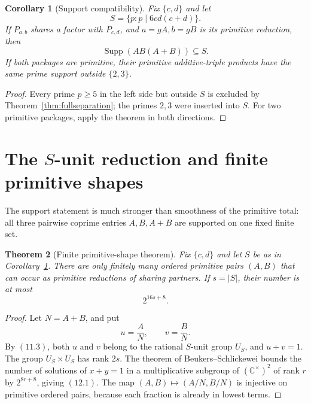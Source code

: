 \documentclass[11pt]{article}
\newtheorem{theorem}{Theorem}[section]
\newtheorem{corollary}[theorem]{Corollary}
\theoremstyle{definition}
\newcommand{\C}{\mathbb C}
\begin{document}
\begin{corollary}[Support compatibility]
\label{cor:supportcompatibility}
Fix \(\{c,d\}\) and let
\[
 S=\{p:p\mid6cd(c+d)\}.
\]
If \(P_{a,b}\) shares a factor with \(P_{c,d}\), and
\(a=gA,b=gB\) is its primitive reduction, then
\begin{equation}
 \operatorname{Supp}(AB(A+B))\subseteq S.
 \tag{11.3}
\end{equation}
If both packages are primitive, their primitive additive-triple products have
the same prime support outside \(\{2,3\}\).
\end{corollary}

\begin{proof}
Every prime \(p\geq5\) in the left side but outside \(S\) is excluded by
Theorem~\ref{thm:fullseparation}; the primes \(2,3\) were inserted into
\(S\).  For two primitive packages, apply the theorem in both directions.
\end{proof}

\section{The \texorpdfstring{\(S\)}{S}-unit reduction and finite primitive shapes}
\label{sec:sunit}

The support statement is much stronger than smoothness of the primitive total:
all three pairwise coprime entries \(A,B,A+B\) are supported on one fixed
finite set.

\begin{theorem}[Finite primitive-shape theorem]
\label{thm:finiteshapes}
Fix \(\{c,d\}\) and let \(S\) be as in
Corollary~\ref{cor:supportcompatibility}.  There are only finitely many
ordered primitive pairs \((A,B)\) that can occur as primitive reductions of
sharing partners.  If \(s=|S|\), their number is at most
\begin{equation}
 2^{16s+8}.
 \tag{12.1}
\end{equation}
\end{theorem}

\begin{proof}
Let \(N=A+B\), and put
\[
 u=\frac{A}{N},\qquad v=\frac{B}{N}.
\]
By \((11.3)\), both \(u\) and \(v\) belong to the rational \(S\)-unit
group \(U_S\), and \(u+v=1\).  The group
\(U_S\times U_S\) has rank \(2s\).  The theorem of
Beukers--Schlickewei \cite{BeukersSchlickewei1996} bounds the number of
solutions of \(x+y=1\) in a multiplicative subgroup of
\((\C^\times)^2\) of rank \(r\) by \(2^{8r+8}\), giving \((12.1)\).
The map \((A,B)\mapsto(A/N,B/N)\) is injective on primitive ordered pairs,
because each fraction is already in lowest terms.
\end{proof}
\end{document}
